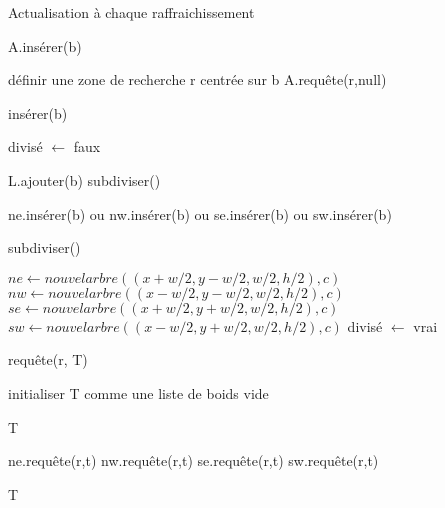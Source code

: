 \documentclass{article}
\begin{document}
\begin{algorithm}[H]
    \caption{Actualisation à chaque raffraichissement}
    \begin{algorithmic}

        \STATE A.insérer(b)
        \ENDFOR

        \medbreak

        \STATE définir une zone de recherche r centrée sur b
        \STATE A.requête(r,null)
        \ENDFOR
    \end{algorithmic}
\end{algorithm}
\begin{algorithm}[H]
    \caption{insérer(b)}
    \begin{algorithmic}

        \STATE divisé $\leftarrow$ faux
        \RETURN \FALSE
        \ENDIF

        \medbreak

        \STATE L.ajouter(b)
        \RETURN \TRUE
        \STATE subdiviser()
        \ENDIF

        \medbreak

        \RETURN ne.insérer(b) ou nw.insérer(b) ou se.insérer(b) ou sw.insérer(b)
    \end{algorithmic}
\end{algorithm}

\begin{algorithm}[H]
    \caption{subdiviser()}
    \begin{algorithmic}

        \STATE $ne \leftarrow nouvel arbre((x+w/2, y-w/2, w/2, h/2), c)$
        \STATE $nw \leftarrow nouvel arbre((x-w/2, y-w/2, w/2, h/2), c)$
        \STATE $se \leftarrow nouvel arbre((x+w/2, y+w/2, w/2, h/2), c)$
        \STATE $sw \leftarrow nouvel arbre((x-w/2, y+w/2, w/2, h/2), c)$
        \STATE divisé $\leftarrow$ vrai
    \end{algorithmic}
\end{algorithm}


\begin{algorithm}[H]
    \caption{requête(r, T)}
    \begin{algorithmic}

        \STATE initialiser T comme une liste de boids vide
        \ENDIF

        \medbreak

        \RETURN T
        \ENDIF

        \medbreak

        \STATE ne.requête(r,t)
        \STATE nw.requête(r,t)
        \STATE se.requête(r,t)
        \STATE sw.requête(r,t)
        \ENDFOR

        \medbreak

        \RETURN T
    \end{algorithmic}
\end{algorithm}
\end{document}
